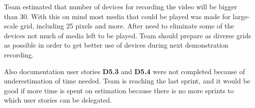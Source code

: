 Team estimated that number of devices for recording the video will be bigger than 30. With this on mind most media that could be played was made for large-scale grid, including 25 pixels and more. After need to eliminate some of the devices not much of media left to be played. Team should prepare as diverse grids as possible in order to get better use of devices during next demonstration recording.

Also documentation user stories \textbf{D5.3} and \textbf{D5.4} were not completed because of underestimation of time needed. Team is reaching the last sprint, and it would be good if more time is spent on estimation because there is no more sprints to which user stories can be delegated.   



